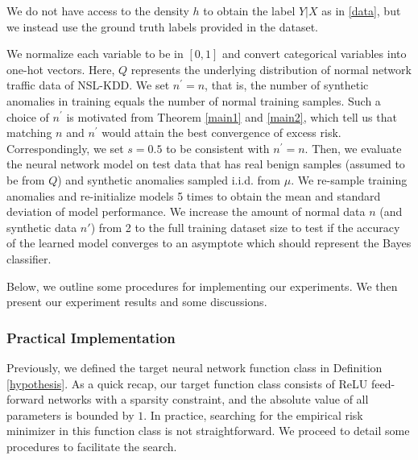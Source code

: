 \documentclass{article}
\begin{document}
We do not have access to the density $h$ to obtain the label $Y|X$ as in \eqref{data}, but we instead use the ground truth labels provided in the dataset.

We normalize each variable to be in $[0,1]$ and convert categorical variables into one-hot vectors. 
Here, $Q$ represents the underlying distribution of normal network traffic data of NSL-KDD. 
We set $n^\prime=n$, that is, the number of synthetic anomalies in training equals the number of normal training samples. Such a choice of $n^\prime$ is motivated from Theorem \ref{main1} and \ref{main2}, which tell us that matching $n$ and $n^\prime$ would attain the best convergence of excess risk. Correspondingly, we set $s=0.5$ to be consistent with $n^\prime=n$. 
Then, we evaluate the neural network model on test data that has real benign samples (assumed to be from $Q$) and synthetic anomalies sampled i.i.d. from $\mu$.
We re-sample training anomalies and re-initialize models 5 times to obtain the mean and standard deviation of model performance.
We increase the amount of normal data $n$ (and synthetic data $n'$) from 2 to the full training dataset size to test if the accuracy of the learned model converges to an asymptote which should represent the Bayes classifier.

Below, we outline some procedures for implementing our experiments. We then present our experiment results and some discussions. 

\subsubsection{Practical Implementation}
\label{section:practical_implementation}

Previously, we defined the target neural network function class in Definition \ref{hypothesis}. As a quick recap, our target function class consists of ReLU feed-forward networks with a sparsity constraint, and the absolute value of all parameters is bounded by $1$.
In practice, searching for the empirical risk minimizer in this function class is not straightforward.
We proceed to detail some procedures to facilitate the search.
\end{document}
